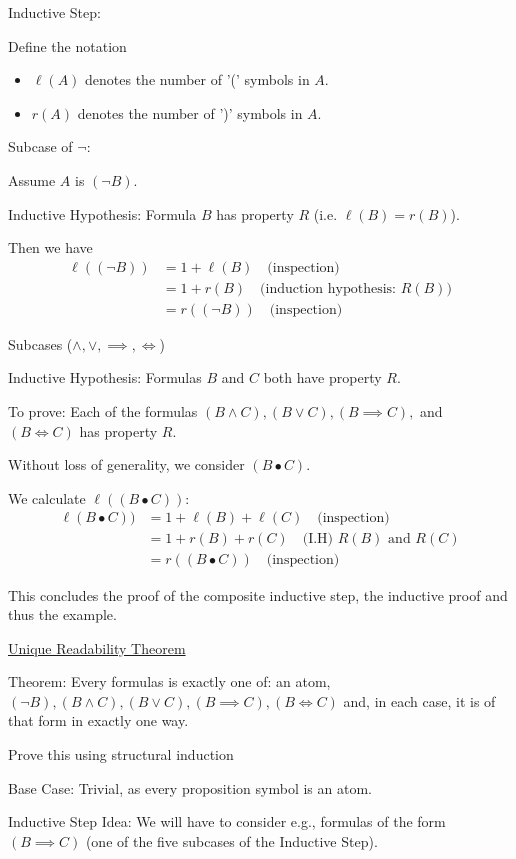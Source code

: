 \documentclass{article}
\begin{document}
Inductive Step:

Define the notation
\begin{itemize}
    \item $\ell(A)$ denotes the number of '(' symbols in $A$. 
    \item $r(A)$ denotes the number of ')' symbols in $A$. 
\end{itemize}

Subcase of $\neg$:

Assume $A$ is $(\neg B)$.

Inductive Hypothesis: Formula $B$ has property $R$ (i.e. $\ell(B) = r(B)$).

Then we have
\begin{align*}
\ell((\neg B)) &= 1 + \ell(B) \quad \text{(inspection)} \\
&= 1 + r(B) \quad \text{(induction hypothesis: } R(B) \text{)} \\
&= r((\neg B)) \quad \text{(inspection)}
\end{align*}

Subcases ($\wedge, \vee, \implies, \iff$)

Inductive Hypothesis: Formulas $B$ and $C$ both have property $R$. 

To prove: Each of the formulas $(B \wedge C), (B \vee C), (B \implies C),$ and $(B \iff C)$ has property $R$. 

Without loss of generality, we consider $(B \bullet C)$. 

We calculate $\ell((B \bullet C))$:
\begin{align*}
\ell(B \bullet C)) &= 1 + \ell(B) + \ell(C) \quad \text{(inspection)} \\
&= 1 + r(B) + r(C) \quad \text{(I.H) } R(B) \text{ and } R(C) \\
&= r((B \bullet C)) \quad \text{(inspection)}
\end{align*}

This concludes the proof of the composite inductive step, the inductive proof and thus the example. 

\underline{Unique Readability Theorem}

Theorem: Every formulas is exactly one of: an atom, $(\neg B), (B \wedge C), (B \vee C), (B \implies C), (B \iff C)$ and, in each case, it is of that form in exactly one way. 

Prove this using structural induction 

Base Case: Trivial, as every proposition symbol is an atom. 

Inductive Step Idea: We will have to consider e.g., formulas of the form $(B \implies C)$ (one of the five subcases of the Inductive Step). 
\end{document}
